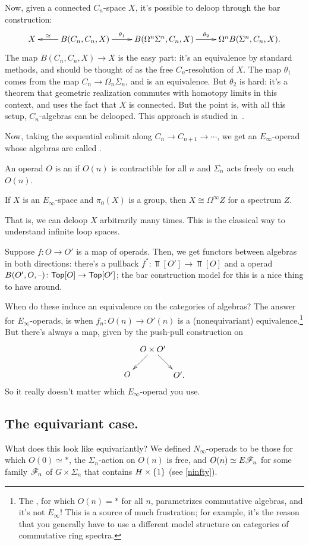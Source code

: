 Now, given a connected $C_n$-space $X$, it's possible to deloop through the bar construction:
\[\xymatrix{
	X & B(C_n,C_n,X)\ar[l]_-\simeq\ar[r]^-{\theta_1} & B(\Omega^n\Sigma^n, C_n, X)\ar[r]^-{\theta_2} &\Omega^n
	B(\Sigma^n, C_n, X).
}\]
The map $B(C_n,C_n, X)\to X$ is the easy part: it's an equivalence by standard methods, and should be thought of as
the free $C_n$-resolution of $X$. The map $\theta_1$ comes from the map $C_n\to\Omega_n\Sigma_n$, and is an
equivalence. But $\theta_2$ is hard: it's a theorem that geometric realization commutes with homotopy limits in
this context, and uses the fact that $X$ is connected. But the point is, with all this setup, $C_n$-algebras can be
delooped. This approach is studied in~\cite{MayGILS}.

Now, taking the sequential colimit along $C_n\to C_{n+1}\to\dotsb$, we get an $E_\infty$-operad whose algebras are
called .
\begin{defn}
An operad $O$ is an  if $O(n)$ is contractible for all $n$ and $\Sigma_n$ acts freely on
each $O(n)$.
\end{defn}
\begin{thm}
If $X$ is an $E_\infty$-space and $\pi_0(X)$ is a group, then $X\cong\Omega^\infty Z$ for a spectrum $Z$.
\end{thm}
That is, we can deloop $X$ arbitrarily many times. This is the classical way to understand infinite loop spaces.

Suppose $f\colon O\to O'$ is a map of operads. Then, we get functors between algebras in both directions: there's a
pullback $f^*\colon\Top[O']\to\Top[O]$ and a  operad $B(O',O,\text{--})\colon\mathsf{Top}[O]\to\mathsf{Top}[O']$;
the bar construction model for this is a nice thing to have around.

When do these induce an equivalence on the categories of algebras? The answer for $E_\infty$-operads,
is when $f_n\colon O(n)\to O'(n)$ is a (nonequivariant) equivalence.\footnote{The , for
which $O(n) = *$ for all $n$, parametrizes commutative algebras, and it's not $E_\infty$! This is a source of much
frustration; for example, it's the reason that you generally have to use a different model structure on categories
of commutative ring spectra.} But there's always a map, given by the push-pull construction on
\[\xymatrix@dr{
	O\times O'\ar[r]\ar[d] & O'.\\
	O
}\]
So it really doesn't matter which $E_\infty$-operad you use.
\subsection*{The equivariant case.} What does this look like equivariantly? We defined
$N_\infty$-operads to be those for which $O(0)\simeq *$, the $\Sigma_n$-action on $O(n)$ is free, and $O(n)\simeq
E\mathscr F_n$ for some family $\mathscr F_n$ of $G\times\Sigma_n$ that contains $H\times\{1\}$ (see \cref{ninfty}).


